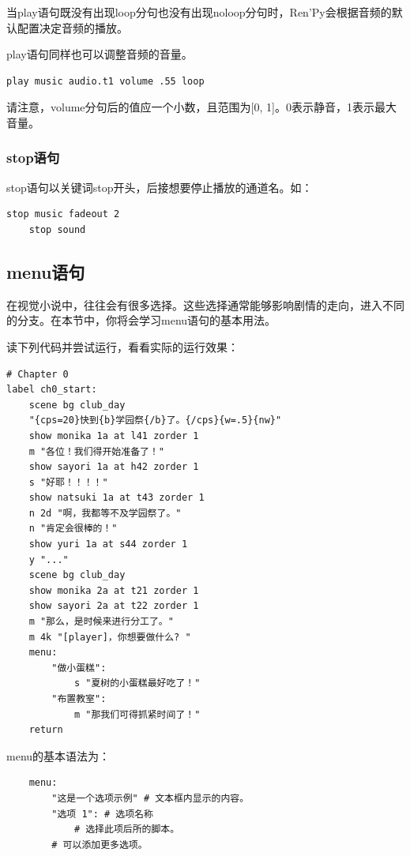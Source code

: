 \documentclass[../../Main.tex]{subfiles}
\begin{document}
\begin{ExtraKnowledge}
    当play语句既没有出现loop分句也没有出现noloop分句时，Ren'Py会根据音频的默认配置决定音频的播放。
\end{ExtraKnowledge}

play语句同样也可以调整音频的音量。
\begin{lstlisting}[numbers=none]
    play music audio.t1 volume .55 loop
\end{lstlisting}
请注意，volume分句后的值应一个小数，且范围为[0, 1]。0表示静音，1表示最大音量。

\subsubsection{stop语句}

stop语句以关键词stop开头，后接想要停止播放的通道名。如：
\begin{lstlisting}[]
    stop music fadeout 2
    stop sound
\end{lstlisting}

\subsection{menu语句}
在视觉小说中，往往会有很多选择。这些选择通常能够影响剧情的走向，进入不同的分支。在本节中，你将会学习menu语句的基本用法。

读下列代码并尝试运行，看看实际的运行效果：
\begin{lstlisting}[caption=script-ch1.rpy]
# Chapter 0
label ch0_start:
    scene bg club_day
    "{cps=20}快到{b}学园祭{/b}了。{/cps}{w=.5}{nw}"
    show monika 1a at l41 zorder 1
    m "各位！我们得开始准备了！"
    show sayori 1a at h42 zorder 1
    s "好耶！！！！"
    show natsuki 1a at t43 zorder 1
    n 2d "啊，我都等不及学园祭了。"
    n "肯定会很棒的！"
    show yuri 1a at s44 zorder 1
    y "..."
    scene bg club_day
    show monika 2a at t21 zorder 1
    show sayori 2a at t22 zorder 1
    m "那么，是时候来进行分工了。"
    m 4k "[player]，你想要做什么? "
    menu:
        "做小蛋糕":
            s "夏树的小蛋糕最好吃了！"
        "布置教室":
            m "那我们可得抓紧时间了！"
    return
\end{lstlisting}

menu的基本语法为：
\begin{lstlisting}
    menu:
        "这是一个选项示例" # 文本框内显示的内容。
        "选项 1": # 选项名称
            # 选择此项后所的脚本。
        # 可以添加更多选项。
\end{lstlisting}
\end{document}
